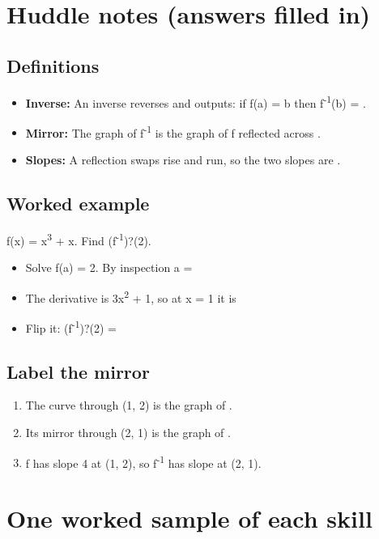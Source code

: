 \documentclass[11pt]{article}
\begin{document}
\section*{Huddle notes (answers filled in)}
\subsection*{Definitions}\begin{itemize}
\item \textbf{Inverse:} An inverse reverses  and outputs: if f(a) = b then f\textsuperscript{-1}(b) = .
\item \textbf{Mirror:} The graph of f\textsuperscript{-1} is the graph of f reflected across .
\item \textbf{Slopes:} A reflection swaps rise and run, so the two slopes are .
\end{itemize}
\subsection*{Worked example}
f(x) = x\textsuperscript{3} + x. Find (f\textsuperscript{-1})?(2).\\
\begin{itemize}
\item Solve f(a) = 2. By inspection a = 
\item The derivative is 3x\textsuperscript{2} + 1, so at x = 1 it is 
\item Flip it: (f\textsuperscript{-1})?(2) = 
\end{itemize}
\subsection*{Label the mirror}
\begin{enumerate}
\item The curve through (1, 2) is the graph of .
\item Its mirror through (2, 1) is the graph of .
\item f has slope 4 at (1, 2), so f\textsuperscript{-1} has slope  at (2, 1).
\end{enumerate}
\section*{One worked sample of each skill}
\end{document}

